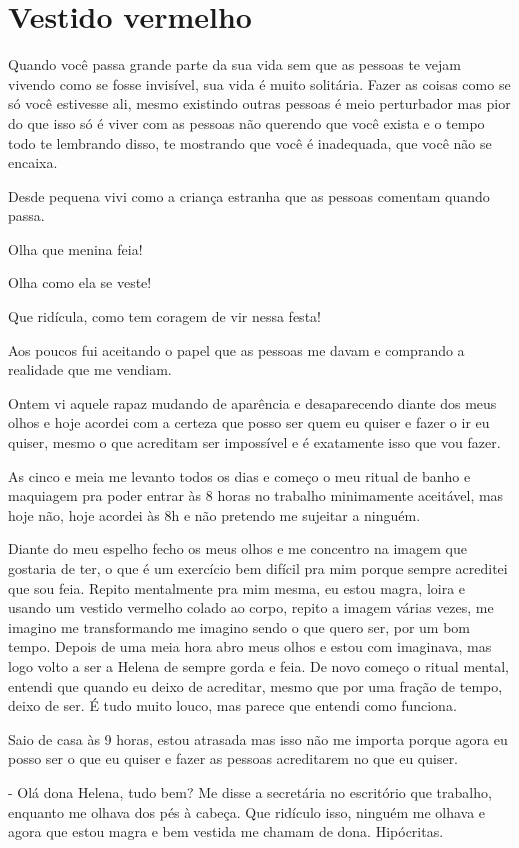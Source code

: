 \chapter{Vestido vermelho}
Quando você passa grande parte da sua vida sem que as pessoas te vejam vivendo como se fosse invisível, sua vida é muito solitária. Fazer as coisas como se só você estivesse ali, mesmo existindo outras pessoas é meio perturbador mas pior do que isso só é viver com as pessoas não querendo que você exista e o tempo todo te lembrando disso, te mostrando que você é inadequada, que você não se encaixa.

Desde pequena vivi como a criança estranha que as pessoas comentam quando passa. 

Olha que menina feia!

Olha como ela se veste!

Que ridícula, como tem coragem de vir nessa festa!

Aos poucos fui aceitando o papel que as pessoas me davam e comprando a realidade que me vendiam.

Ontem vi aquele rapaz mudando de aparência e desaparecendo diante dos meus olhos e hoje acordei com a certeza que posso ser quem eu quiser e fazer o ir eu quiser, mesmo o que acreditam ser impossível e é exatamente isso que vou fazer.

As cinco e meia me levanto todos os dias e começo o meu ritual de banho e maquiagem pra poder entrar às 8 horas no trabalho minimamente aceitável, mas hoje não, hoje acordei às 8h e não pretendo me sujeitar a ninguém.

Diante do meu espelho fecho os meus olhos e me concentro na imagem que gostaria de ter, o que é um exercício bem difícil pra mim porque sempre acreditei que sou feia. Repito mentalmente pra mim mesma, eu estou magra, loira e usando um vestido vermelho colado ao corpo, repito a imagem várias vezes, me imagino me transformando me imagino sendo o que quero ser, por um bom tempo. Depois de uma meia hora abro meus olhos e estou com imaginava, mas logo volto a ser a Helena de sempre gorda e feia. De novo começo o ritual mental, entendi que quando eu deixo de acreditar, mesmo que por uma fração de tempo, deixo de ser. É tudo muito louco, mas parece que entendi como funciona.

Saio de casa às 9 horas, estou atrasada mas isso não me importa porque agora eu posso ser o que eu quiser e fazer as pessoas acreditarem no que eu quiser.

- Olá dona Helena, tudo bem? Me disse a secretária no escritório que trabalho, enquanto me olhava dos pés à cabeça. Que ridículo isso, ninguém me olhava e agora que estou magra e bem vestida me chamam de dona. Hipócritas.

